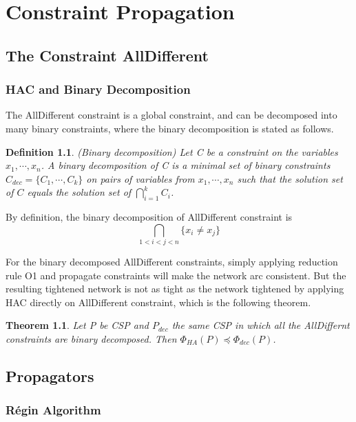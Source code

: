 \documentclass[a4paper, 12pt]{report}
\newtheorem{definition}{Definition}[subsection]
\newtheorem{theorem}{Theorem}[subsection]
\begin{document}
\chapter {Constraint Propagation}


    \section {The Constraint AllDifferent}

        \subsection {HAC and Binary Decomposition}
            
            The AllDifferent constraint is a global constraint, and can be decomposed into many binary constraints, where the binary decomposition is stated as follows.

            \begin{definition}
                (Binary decomposition\cite{van2001alldifferent}) Let C be a constraint on the variables $x_1,\cdots,x_n$. A binary decomposition of C is a minimal set of binary constraints $C_{dec}=\{C_1,\cdots,C_k\}$ on pairs of variables from $x_1, \cdots, x_n$ such that the solution set of $C$ equals the solution set of $\bigcap_{i=1}^k C_i$.
            \end{definition}
            By definition, the binary decomposition of AllDifferent constraint is $$\bigcap_{1<i<j<n} \{x_i\neq x_j\} $$

            For the binary decomposed AllDifferent constraints, simply applying reduction rule O1 and propagate constraints will make the network arc consistent. But the resulting tightened network is not as tight as the network tightened by applying HAC directly on AllDifferent constraint, which is the following theorem.

            \begin{theorem}
                Let P be CSP and $P_{dec}$ the same CSP in which all the AllDiffernt constraints are binary decomposed. Then $\Phi_{HA}(P)\preceq \Phi_{dec}(P)$.
            \end{theorem}

        
     \section {Propagators}

         \subsection{Régin Algorithm}
\end{document}
